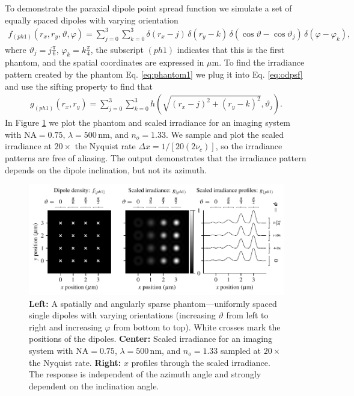 \documentclass[]{osa-article}
\begin{document}
 To demonstrate the paraxial dipole point spread function we simulate a set of
 equally spaced dipoles with varying orientation
 \begin{align}
   f_{(ph1)}(r_x, r_y, \vartheta, \varphi) = \sum_{j=0}^3 \sum_{k=0}^3 \delta\left(r_x - j\right)\, \delta\left(r_y - k\right)\, \delta\left(\cos\vartheta - \cos\vartheta_j\right)\, \delta\left(\varphi - \varphi_k\right),\label{eq:phantom1}
 \end{align}
 where $\vartheta_j = j\frac{\pi}{6}$, $\varphi_k = k\frac{\pi}{4}$, the
 subscript $(ph1)$ indicates that this is the first phantom, and the spatial
 coordinates are expressed in $\mu$m. To find the irradiance pattern created by
 the phantom Eq. \ref{eq:phantom1} we plug it into Eq. \ref{eq:odpsf} and use
 the sifting property to find that
 \begin{align}
   g_{(ph1)}(r_x, r_y) = \sum_{j=0}^3 \sum_{k=0}^3 h\left(\sqrt{\left(r_x - j\right)^2 + \left(r_y - k\right)^2}, \vartheta_j\right).\label{eq:phantom1irr}
 \end{align}
 In Figure \ref{fig:ph1} we plot the phantom and scaled irradiance for an
 imaging system with $\text{NA} = 0.75$, $\lambda = 500\,\text{nm}$, and
 $n_o = 1.33$. We sample and plot the scaled irradiance at $20\times$ the
 Nyquist rate $\Delta x = 1/[20(2\nu_c)]$, so the irradiance patterns are free
 of aliasing. The output demonstrates that the irradiance pattern depends on the
 dipole inclination, but not its azimuth.

 \begin{figure}[h]
 \centering
   \centering
   \includegraphics[scale=0.8]{../figures/paratfs/ph1.pdf}
   \caption{\textbf{Left:} A spatially and angularly sparse phantom---uniformly
     spaced single dipoles with varying orientations (increasing $\vartheta$
     from left to right and increasing $\varphi$ from bottom to top). White
     crosses mark the positions of the dipoles. \textbf{Center:} Scaled
     irradiance for an imaging system with $\text{NA} = 0.75$,
     $\lambda = 500\,\text{nm}$, and $n_o = 1.33$ sampled at $20\times$ the
     Nyquist rate. \textbf{Right:} $x$ profiles through the scaled irradiance.
     The response is independent of the azimuth angle and strongly dependent on
     the inclination angle.}
   \label{fig:ph1}
 \end{figure}
\end{document}

